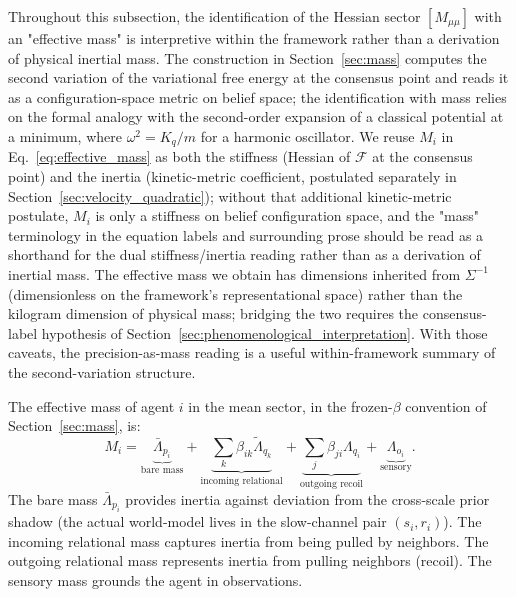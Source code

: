 \documentclass[11pt]{article}
\begin{document}
Throughout this subsection, the identification of the Hessian sector $[M_{\mu\mu}]$ with an "effective mass" is interpretive within the framework rather than a derivation of physical inertial mass. The construction in Section~\ref{sec:mass} computes the second variation of the variational free energy at the consensus point and reads it as a configuration-space metric on belief space; the identification with mass relies on the formal analogy with the second-order expansion of a classical potential at a minimum, where $\omega^2 = K_q/m$ for a harmonic oscillator. We reuse $M_i$ in Eq.~\eqref{eq:effective_mass} as both the stiffness (Hessian of $\mathcal{F}$ at the consensus point) and the inertia (kinetic-metric coefficient, postulated separately in Section~\ref{sec:velocity_quadratic}); without that additional kinetic-metric postulate, $M_i$ is only a stiffness on belief configuration space, and the "mass" terminology in the equation labels and surrounding prose should be read as a shorthand for the dual stiffness/inertia reading rather than as a derivation of inertial mass. The effective mass we obtain has dimensions inherited from $\Sigma^{-1}$ (dimensionless on the framework's representational space) rather than the kilogram dimension of physical mass; bridging the two requires the consensus-label hypothesis of Section~\ref{sec:phenomenological_interpretation}. With those caveats, the precision-as-mass reading is a useful within-framework summary of the second-variation structure.

The effective mass of agent $i$ in the mean sector, in the frozen-$\beta$ convention of Section~\ref{sec:mass}, is:
\begin{equation}
M_i = \underbrace{\bar{\Lambda}_{p_i}}_{\text{bare mass}} + \underbrace{\sum_k \beta_{ik}\tilde{\Lambda}_{q_k}}_{\text{incoming relational}} + \underbrace{\sum_j \beta_{ji}\Lambda_{q_i}}_{\text{outgoing recoil}} + \underbrace{\Lambda_{o_i}}_{\text{sensory}}.
\label{eq:effective_mass}
\end{equation}
The bare mass $\bar{\Lambda}_{p_i}$ provides inertia against deviation from the cross-scale prior shadow (the actual world-model lives in the slow-channel pair $(s_i, r_i)$). The incoming relational mass captures inertia from being pulled by neighbors. The outgoing relational mass represents inertia from pulling neighbors (recoil). The sensory mass grounds the agent in observations.
\end{document}
